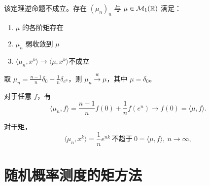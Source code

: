 \begin{remark}
该定理逆命题不成立。存在 $(\mu_n)_n$ 与 $\mu \in \mathcal{M}_1(\mathbb{R})$ 满足：
\begin{enumerate}
    \item $\mu$ 的各阶矩存在
    \item $\mu_n$ 弱收敛到 $\mu$
    \item $\langle \mu_n, x^k \rangle \to \langle \mu, x^k \rangle$不成立
\end{enumerate}

取 $\mu_n = \frac{n-1}{n}\delta_0 + \frac{1}{n}\delta_{e^n}$，则 $\mu_n \xrightarrow{w} \mu$，其中 $\mu = \delta_0$。

对于任意 $f$，有
\[
\langle \mu_n, f \rangle = \frac{n-1}{n}f(0) + \frac{1}{n}f(e^n) \to f(0) = \langle \mu, f \rangle.
\]

对于矩，
\[
\langle \mu_n, x^k \rangle = \frac{1}{n}e^{nk} \ \text{不趋于} \ 0=\langle\mu,f\rangle,\ n \to \infty,
\]

\end{remark}



\section{随机概率测度的矩方法}

